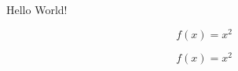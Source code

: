 \documentclass{article}
\begin{document}
   Hello World!

\begin{equation}
   f(x) = x^2
\end{equation}

\begin{equation*}
   f(x) = x^2
\end{equation*}
\end{document}

